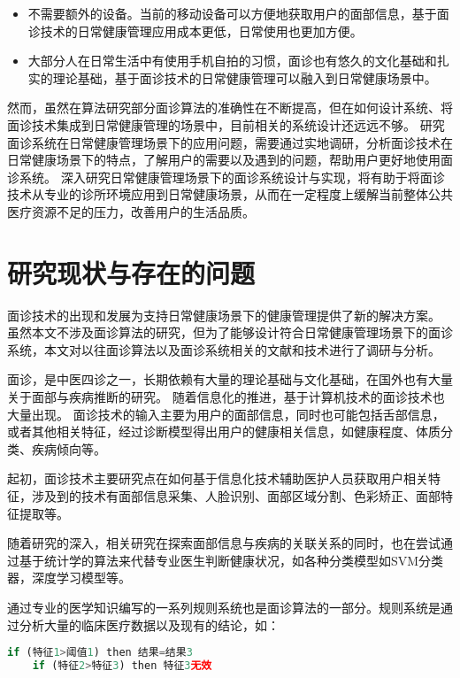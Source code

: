 \begin{itemize}
    \item 不需要额外的设备。当前的移动设备可以方便地获取用户的面部信息，基于面诊技术的日常健康管理应用成本更低，日常使用也更加方便。
    \item 大部分人在日常生活中有使用手机自拍的习惯，面诊也有悠久的文化基础和扎实的理论基础，基于面诊技术的日常健康管理可以融入到日常健康场景中。
\end{itemize}

然而，虽然在算法研究部分面诊算法的准确性在不断提高，但在如何设计系统、将面诊技术集成到日常健康管理的场景中，目前相关的系统设计还远远不够。
研究面诊系统在日常健康管理场景下的应用问题，需要通过实地调研，分析面诊技术在日常健康场景下的特点，了解用户的需要以及遇到的问题，帮助用户更好地使用面诊系统。
深入研究日常健康管理场景下的面诊系统设计与实现，将有助于将面诊技术从专业的诊所环境应用到日常健康场景，从而在一定程度上缓解当前整体公共医疗资源不足的压力，改善用户的生活品质。

\section{研究现状与存在的问题}

面诊技术的出现和发展为支持日常健康场景下的健康管理提供了新的解决方案。
虽然本文不涉及面诊算法的研究，但为了能够设计符合日常健康管理场景下的面诊系统，本文对以往面诊算法以及面诊系统相关的文献和技术进行了调研与分析。

面诊，是中医四诊之一，长期依赖有大量的理论基础与文化基础，在国外也有大量关于面部与疾病推断的研究。
随着信息化的推进，基于计算机技术的面诊技术也大量出现。
面诊技术的输入主要为用户的面部信息，同时也可能包括舌部信息，或者其他相关特征，经过诊断模型得出用户的健康相关信息，如健康程度、体质分类、疾病倾向等。

起初，面诊技术主要研究点在如何基于信息化技术辅助医护人员获取用户相关特征，涉及到的技术有面部信息采集、人脸识别、面部区域分割、色彩矫正、面部特征提取等。

随着研究的深入，相关研究在探索面部信息与疾病的关联关系的同时，也在尝试通过基于统计学的算法来代替专业医生判断健康状况，如各种分类模型如SVM分类器，深度学习模型等。

通过专业的医学知识编写的一系列规则系统也是面诊算法的一部分。规则系统是通过分析大量的临床医疗数据以及现有的结论，如：

\begin{lstlisting}[language={Python}, title=诊断规则]
    if (特征1>阈值1) then 结果=结果3
    if (特征2>特征3) then 特征3无效
\end{lstlisting}

